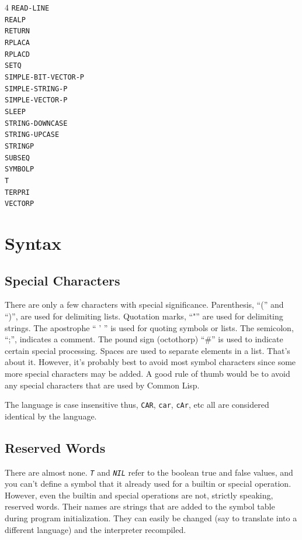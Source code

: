 \documentclass[10pt, openany]{book}
\newcommand{\function}[1]{\texttt{#1}}
\newcommand{\constant}[1]{\emph{\texttt{#1}}}
\newcommand{\keyword}[1]{\texttt{#1}}
\newcommand{\cl}{Common Lisp}
\begin{document}
\begin{multicols}{4}
  \keyword{READ-LINE}\\
  \keyword{REALP}\\
  \keyword{RETURN}\\
  \keyword{RPLACA}\\
  \keyword{RPLACD}\\
  \keyword{SETQ}\\
  \keyword{SIMPLE-BIT-VECTOR-P}\\
  \keyword{SIMPLE-STRING-P}\\
  \keyword{SIMPLE-VECTOR-P}\\
  \keyword{SLEEP}\\
  \keyword{STRING-DOWNCASE}\\
  \keyword{STRING-UPCASE}\\
  \keyword{STRINGP}\\
  \keyword{SUBSEQ}\\
  \keyword{SYMBOLP}\\
  \keyword{T}\\
  \keyword{TERPRI}\\
  \keyword{VECTORP}\\
\end{multicols}

\section{Syntax}

\subsection{Special Characters}
There are only a few characters with special significance.  Parenthesis, ``('' and ``)'', are used for delimiting lists.  Quotation marks, ``"'' are used for delimiting strings.  The apostrophe `` ' '' is used for quoting symbols or lists.  The semicolon, ``;'', indicates a comment.  The pound sign (octothorp) ``\#'' is used to indicate certain special processing.  Spaces are used to separate elements in a list.  That's about it.  However, it's probably best to avoid most symbol characters since some more special characters may be added.  A good rule of thumb would be to avoid any special characters that are used by \cl.

The language is case insensitive thus, \function{CAR}, \function{car}, \function{cAr}, etc all are considered identical by the language.

\subsection{Reserved Words}
There are almost none.  \constant{T} and \constant{NIL} refer to the boolean true and false values, and you can't define a symbol that it already used for a builtin or special operation.  However, even the builtin and special operations are not, strictly speaking, reserved words.  Their names are strings that are added to the symbol table during program initialization.  They can easily be changed (say to translate into a different language) and the interpreter recompiled.
\end{document}
